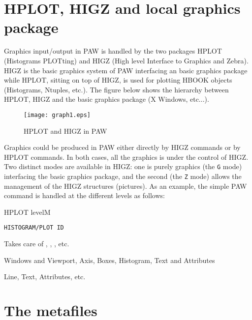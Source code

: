 \section{HPLOT, HIGZ and local graphics package}

Graphics input/output in PAW is handled by the two packages HPLOT (Histograms 
PLOTting) and HIGZ (High level Interface to Graphics and Zebra). HIGZ is the 
basic graphics system of PAW interfacing an basic graphics package while 
HPLOT, sitting on top of HIGZ, is used for plotting HBOOK objects (Histograms, 
Ntuples, etc.). The figure below shows the hierarchy between HPLOT, HIGZ and 
the basic graphics package (X Windows, etc...).

\begin{figure}
\centering\texttt{[image: graph1.eps]}
\caption{HPLOT and HIGZ in PAW}
\label{fig:GRAPH1}
\end{figure}

Graphics could be produced in PAW either directly by HIGZ commands or by HPLOT
commands. In both cases, all the graphics is under the control of HIGZ. Two 
distinct modes are available in HIGZ: one is purely graphics (the \texttt{G} mode)
interfacing the basic graphics package, and the second (the \texttt{Z} mode)
allows the management of the HIGZ structures (pictures). As an example, the 
simple PAW command  is handled at the different levels
as follows:

\begin{DL}{HPLOT levelM}
\item[PAW Level]      \texttt{HISTOGRAM/PLOT ID}
\item[HPLOT Level]    Takes care of , 
                      , , etc.
\item[HIGZ Level]     Windows and Viewport, Axis, Boxes, 
                      Histogram, Text and Attributes
\item[Basic graphics] Line, Text, Attributes, etc.
\end{DL}

\section{The metafiles}

